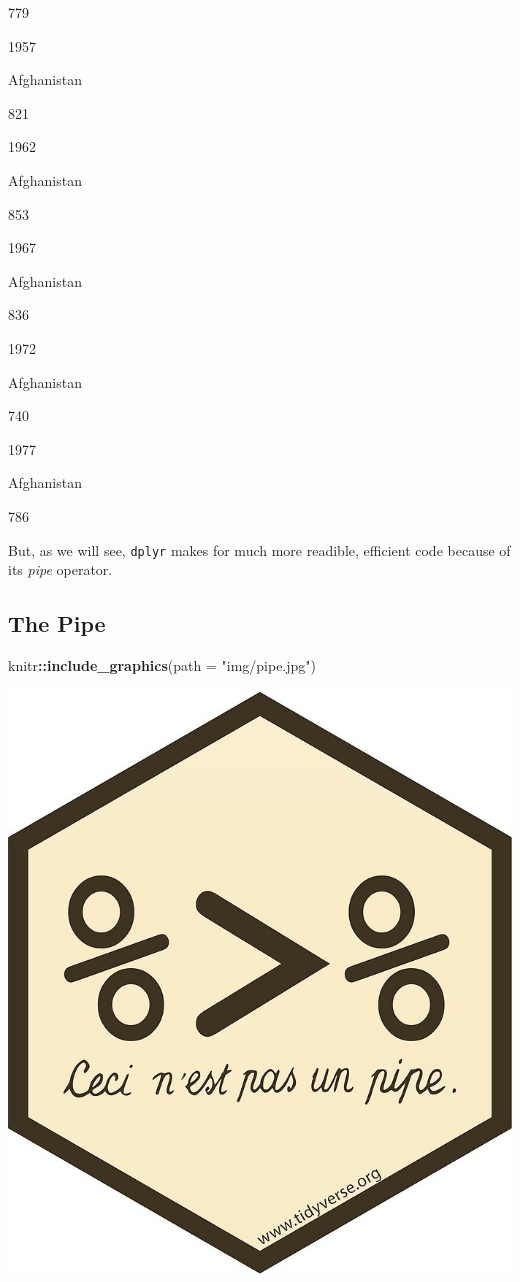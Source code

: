 \documentclass[]{book}
\newenvironment{Shaded}{\begin{snugshade}}{\end{snugshade}}
\newcommand{\DataTypeTok}[1]{\textcolor[rgb]{0.13,0.29,0.53}{#1}}
\newcommand{\KeywordTok}[1]{\textcolor[rgb]{0.13,0.29,0.53}{\textbf{#1}}}
\newcommand{\NormalTok}[1]{#1}
\newcommand{\OperatorTok}[1]{\textcolor[rgb]{0.81,0.36,0.00}{\textbf{#1}}}
\newcommand{\StringTok}[1]{\textcolor[rgb]{0.31,0.60,0.02}{#1}}
\begin{document}
779

1957

Afghanistan

821

1962

Afghanistan

853

1967

Afghanistan

836

1972

Afghanistan

740

1977

Afghanistan

786

But, as we will see, \texttt{dplyr} makes for much more readible, efficient code because of its \emph{pipe} operator.

\hypertarget{the-pipe}{%
\subsection{The Pipe}\label{the-pipe}}

\begin{Shaded}
\begin{Highlighting}[]
\NormalTok{knitr}\OperatorTok{::}\KeywordTok{include_graphics}\NormalTok{(}\DataTypeTok{path =} \StringTok{"img/pipe.jpg"}\NormalTok{)}
\end{Highlighting}
\end{Shaded}

\begin{center}\includegraphics[width=0.7\linewidth]{img/pipe} \end{center}
\end{document}
